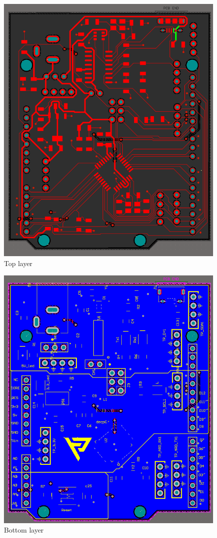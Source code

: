 \documentclass[a4paper,11pt]{article}%
\begin{document}
\begin{figure}[H]
	\centering
	\includegraphics[scale=0.6]{figures/pcb/top_layer.png}
	\caption{Top layer}
	\label{top}
\end{figure}

\begin{figure}[H]
	\centering
	\includegraphics[scale=0.6]{figures/pcb/bottom_layer.png}
	\caption{Bottom layer}
	\label{top}
\end{figure}
\end{document}
